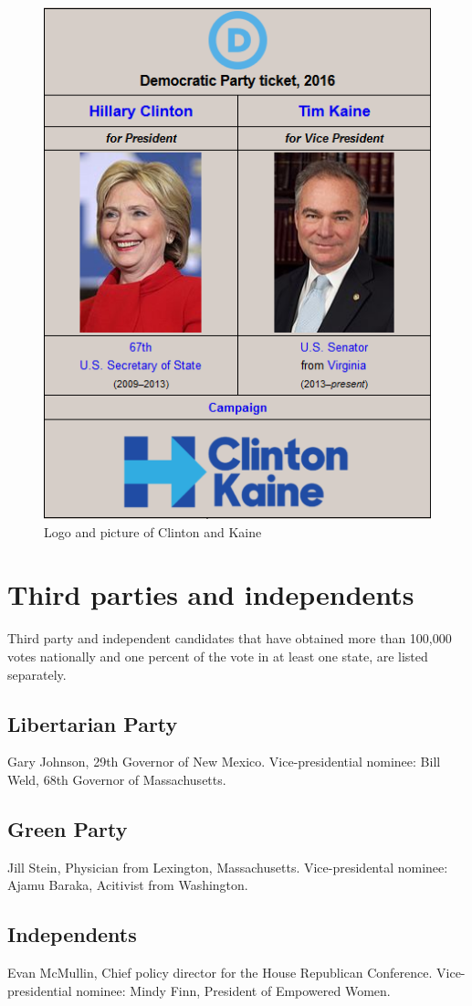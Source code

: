 \begin{figure}[!h]
	\begin{center}
		\includegraphics[width=0.6\linewidth]{images/clinton}
		\caption{Logo and picture of Clinton and Kaine}
	\end{center}
\end{figure}

\newpage

\section{Third parties and independents}

Third party and independent candidates that have obtained more than 100,000 votes nationally and one percent of the vote in at least one state, are listed separately.

	\subsection{Libertarian Party}
	Gary Johnson, 29th Governor of New Mexico. Vice-presidential nominee: Bill Weld, 68th Governor of Massachusetts.
	
	\subsection{Green Party}
	Jill Stein, Physician from Lexington, Massachusetts. Vice-presidental nominee: Ajamu Baraka, Acitivist from Washington.
	
	\subsection{Independents}
	Evan McMullin, Chief policy director for the House Republican Conference. Vice-presidential nominee: Mindy Finn, President of Empowered Women.
	
